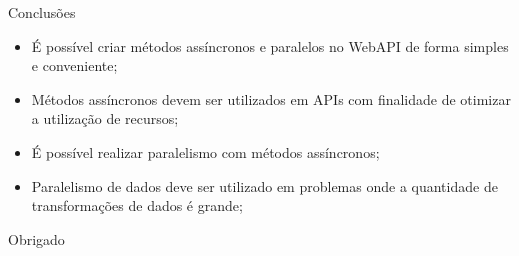 \documentclass[10pt]{beamer}
\begin{document}
\begin{frame}{Conclusões}
	\begin{itemize}
		\item É possível criar métodos assíncronos e paralelos no WebAPI de forma simples e conveniente; 
		\vspace{0.2cm}
		\item Métodos assíncronos devem ser utilizados em APIs com finalidade de otimizar a utilização de recursos;
		\vspace{0.2cm}
		\item É possível realizar paralelismo com métodos assíncronos;
		\vspace{0.2cm}
		\item Paralelismo de dados deve ser utilizado em problemas onde a quantidade de transformações de dados é grande;
	\end{itemize}
\end{frame}


\begin{frame}[standout]
  Obrigado
\end{frame}
\end{document}
